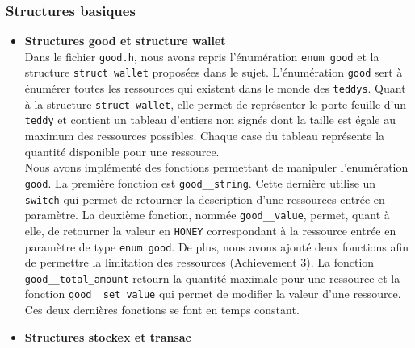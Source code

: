 \documentclass[12pt]{article}
\begin{document}
        \subsubsection{Structures basiques}
        \begin{itemize}
         \item \textbf{Structures good et structure wallet}\\
         
         Dans le fichier \texttt{good.h}, nous avons repris l'énumération \texttt{enum good} et la structure \texttt{struct wallet} proposées dans le sujet. L'énumération \texttt{good} sert à énumérer toutes les ressources qui existent dans le monde des \texttt{teddys}. Quant à la structure \texttt{struct wallet}, elle permet de représenter le porte-feuille d'un \texttt{teddy} et contient un tableau d'entiers non signés dont la taille est égale au maximum des ressources possibles. Chaque case du tableau représente la quantité disponible pour une ressource. \\
         
         Nous avons implémenté des fonctions permettant de manipuler l'enumération \texttt{good}. La première fonction est \texttt{good\_\_string}. Cette dernière utilise un \texttt{switch} qui permet de retourner la description d'une ressources entrée en paramètre. La deuxième fonction, nommée \texttt{good\_\_value}, permet, quant à elle, de retourner la valeur en \texttt{HONEY} correspondant à la ressource entrée en paramètre de type \texttt{enum good}. De plus, nous avons ajouté deux fonctions afin de permettre la limitation des ressources (Achievement 3). La fonction \texttt{good\_\_total\_amount} retourn la quantité maximale pour une ressource et la fonction \texttt{good\_\_set\_value} qui permet de modifier la valeur d'une ressource. Ces deux dernières fonctions se font en temps constant.\\
         
         
         \item \textbf{Structures stockex et transac}\\
         

\end{itemize}
\end{document}
